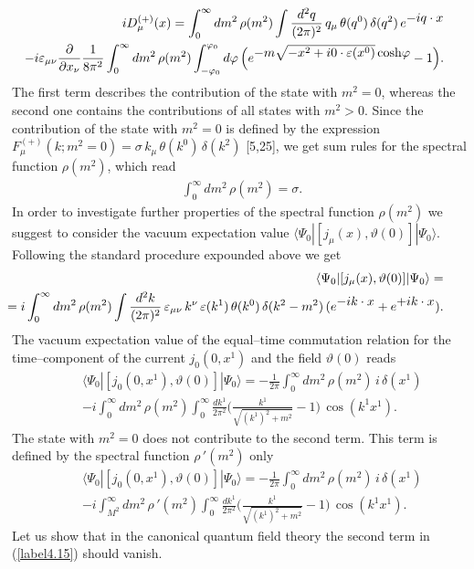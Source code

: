 \documentclass[a4paper,12pt] {article}
\begin{document}
%
\begin{eqnarray}\label{label4.11}
\hspace{-0.3in}&&iD^{(+)}_{\mu}(x)
=\int^{\infty}_0dm^2\,\rho(m^2)\int
\frac{d^2q}{(2\pi)^2}\,q_{\mu}\,\theta(q^0)\,\delta(q^2)\,e^{\textstyle
-iq\cdot x}\nonumber\\ \hspace{-0.3in}&& - i
\varepsilon_{\mu\nu}\frac{\partial}{\partial
x_{\nu}}\frac{1}{8\pi^2}\int^{\infty}_0dm^2\,\rho(m^2)
\int^{\varphi_0}_{-\varphi_0}d\varphi\,\Big(e^{\textstyle -m\sqrt{-x^2
+ i0\cdot \varepsilon(x^0)}\,{\cosh}\varphi} - 1\Big).
\end{eqnarray}
%
The first term describes the contribution of the state with $m^2 = 0$,
whereas the second one contains the contributions of all states with
$m^2 > 0$.  Since the contribution of the state with $m^2 = 0$ is
defined by the expression $F^{(+)}_{\mu}(k; m^2 = 0)
=\sigma\,k_{\mu}\,\theta(k^0)\,\delta(k^2)$ [5,25], we get sum rules
for the spectral function $\rho(m^2)$, which read
%
\begin{eqnarray}\label{label4.12}
\int^{\infty}_0dm^2\,\rho(m^2) = \sigma.
\end{eqnarray}
%
In order to investigate further properties of the spectral function
$\rho(m^2)$ we suggest to consider the vacuum expectation value
$\langle \Psi_0|[j_{\mu}(x), \vartheta(0)]| \Psi_0 \rangle$. Following
the standard procedure expounded above we get
%
\begin{eqnarray}\label{label4.13}
\hspace{-0.5in}&&\langle
\Psi_0|[j_{\mu}(x),\vartheta(0)]|\Psi_0\rangle = \nonumber\\
\hspace{-0.5in}&& = i\int^{\infty}_0dm^2\,\rho(m^2)\int
\frac{d^2k}{(2\pi)^2}\,\varepsilon_{\mu\nu}\,k^{\nu}\,
\varepsilon(k^1)\,\theta(k^0)\,\delta(k^2 - m^2)\,(e^{\textstyle
-ik\cdot x} + e^{\textstyle +ik\cdot x}).
\end{eqnarray}
%
The vacuum expectation value of the equal--time commutation relation
for the time--component of the current $j_0(0,x^1)$ and the field
$\vartheta(0)$ reads
%
\begin{eqnarray}\label{label4.14}
&&\langle \Psi_0|[j_0(0,x^1),\vartheta(0)]|\Psi_0\rangle =
-\frac{1}{2\pi}\int^{\infty}_0dm^2\,\rho(m^2)\,i\,\delta(x^1)
\nonumber\\&&- i\int^{\infty}_0dm^2\,\rho(m^2)\int^{\infty}_0
\frac{dk^1}{2\pi^2}\Big(\frac{k^1}{\sqrt{(k^1)^2 + m^2}} -
1\Big)\,\cos(k^1x^1).
\end{eqnarray}
%
The state with $m^2 = 0$ does not contribute to the second term. This
term is defined by the spectral function $\rho\,'(m^2)$ only 
%
\begin{eqnarray}\label{label4.15}
&&\langle \Psi_0|[j_0(0,x^1),\vartheta(0)]|\Psi_0\rangle =
-\frac{1}{2\pi}\int^{\infty}_0dm^2\,\rho(m^2)\,i\,\delta(x^1)
\nonumber\\&&- i\int^{\infty}_{M^2}dm^2\,\rho\,'(m^2)\int^{\infty}_0
\frac{dk^1}{2\pi^2}\Big(\frac{k^1}{\sqrt{(k^1)^2 + m^2}} -
1\Big)\,\cos(k^1x^1).
\end{eqnarray}
%
Let us show that in the canonical quantum field theory the second term
in (\ref{label4.15}) should vanish.
\end{document}
